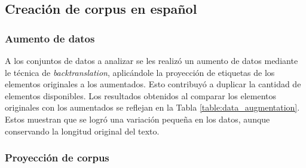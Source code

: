 \subsection{Creación de corpus en español}

\subsubsection{Aumento de datos}

A los conjuntos de datos a analizar se les realizó un aumento de datos mediante le técnica de \emph{backtranslation},
aplicándole la proyección de etiquetas de los elementos originales a los aumentados.
Esto contribuyó a duplicar la cantidad de elementos disponibles. Los resultados obtenidos al comparar los 
elementos originales con los aumentados se reflejan en la Tabla \ref{table:data_augmentation}.
Estos muestran que se logró una variación pequeña en los datos, aunque conservando la 
longitud original del texto. 

\begin{table}[h!]
	\begin{center}
	\caption{Datos promedios comparando los textos originales con los aumentados.}\label{table:data_augmentation}
	\end{center}
\end{table}

\subsubsection{Proyección de corpus}

